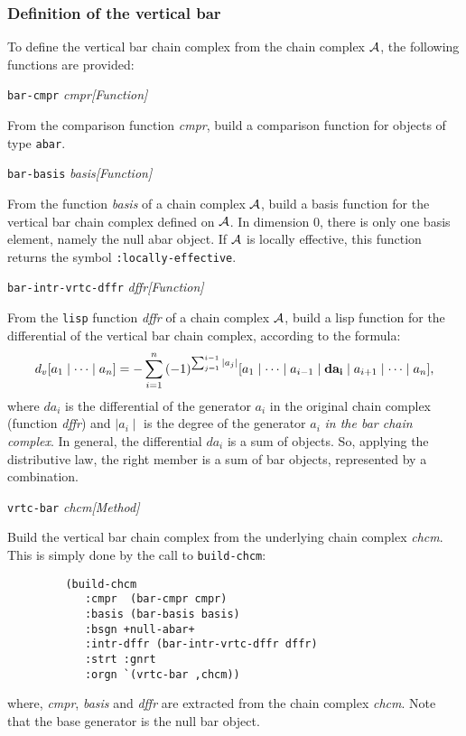 \subsubsection {Definition of the vertical bar}

To define the vertical bar chain complex from the chain complex ${\cal A}$, the
following functions are provided:
\vskip 0.45cm
{\parindent=0mm
{\leftskip=5mm
{\tt bar-cmpr} {\em cmpr}\hfill {\em [Function]} \par}
{\leftskip=15mm
From the comparison function {\em cmpr}, build a comparison function for objects
of  type {\tt abar}. \par}
{\leftskip=5mm
{\tt bar-basis} {\em basis}\hfill {\em [Function]} \par}
{\leftskip=15mm
From the function {\em basis} of a  chain complex ${\cal A}$, build a basis
function for the vertical bar chain complex defined on ${\cal A}$. In dimension $0$, there
is only one basis element, namely the null abar object. If ${\cal A}$ is locally effective,
this function returns the symbol {\tt :locally-effective}. \par}
{\leftskip=5mm
{\tt bar-intr-vrtc-dffr} {\em dffr}\hfill {\em [Function]} \par}
{\leftskip=15mm
From the {\tt lisp} function {\em dffr} of a chain complex  ${\cal A}$, build a
lisp function for the differential of the vertical bar chain complex, according to the formula:
$$d_v [a_1 \mid \cdots \mid a_n]=
-\sum_{i=1}^n{(-1)^{\sum_{j=1}^{i-1}{\mid a_j \mid}}}
 {[a_1 \mid \cdots \mid a_{i-1} \mid {\bf da_i} \mid a_{i+1} \mid \cdots \mid a_n]},$$
where $da_i$ is the differential of the generator $a_i$ in the original chain complex (function {\em dffr})
and $\mid a_i \mid$ is the degree of the generator $a_i$ {\em in the bar chain complex}.
In general, the differential $da_i$ is a sum of  objects.
So, applying the distributive law, the right member is a sum of bar objects, represented by a combination. \par}
{\leftskip=5mm
{\tt vrtc-bar} {\em chcm}\hfill {\em [Method]} \par}
{\leftskip=15mm
Build the vertical bar chain complex from the underlying chain complex {\em chcm}. This is simply done by the
call to {\tt build-chcm}:
{\footnotesize\begin{verbatim}
         (build-chcm
            :cmpr  (bar-cmpr cmpr)
            :basis (bar-basis basis)
            :bsgn +null-abar+
            :intr-dffr (bar-intr-vrtc-dffr dffr)
            :strt :gnrt
            :orgn `(vrtc-bar ,chcm))
\end{verbatim}}
where, {\em cmpr}, {\em basis} and {\em dffr} are extracted from the chain complex {\em chcm}. Note that
the base generator is the null bar object. \par}
}

